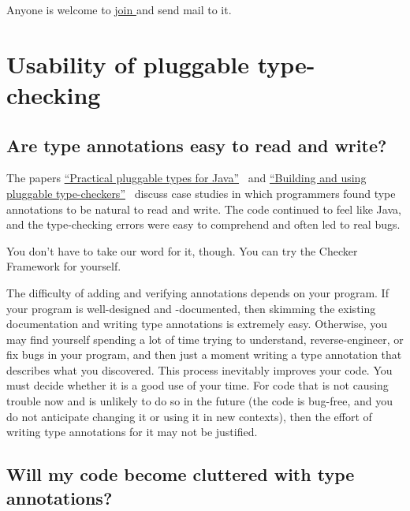 Anyone is welcome to
\href{https://groups.google.com/forum/#!forum/checker-framework-discuss}{join
  } and send mail to it.


\section{Usability of pluggable type-checking\label{faq-usability-section}}

\subsection{Are type annotations easy to read and write?\label{faq-ease-of-use}}


The papers
\href{http://homes.cs.washington.edu/~mernst/pubs/pluggable-checkers-issta2008-abstract.html}{``Practical
  pluggable types for Java''}~\cite{PapiACPE2008}
and
\href{http://homes.cs.washington.edu/~mernst/pubs/pluggable-checkers-icse2011-abstract.html}{``Building
  and using pluggable type-checkers''}~\cite{DietlDEMS2011}
discuss case studies in
which programmers
found type annotations to be natural to read and write.  The code
continued to feel like Java, and the type-checking errors were easy to
comprehend and often led to real bugs.

You don't have to take our word for it, though.  You can try the
Checker Framework for yourself.

The difficulty of adding and verifying annotations depends on your program.
If your program is well-designed and -documented, then skimming the
existing documentation and writing type annotations is extremely easy.
Otherwise, you may find yourself spending a lot of time trying to
understand, reverse-engineer, or fix bugs in your program, and then just a
moment writing a type annotation that describes what you discovered.  This
process inevitably improves your code.  You must decide whether it is a
good use of your time.  For code that is not causing trouble now and is
unlikely to do so in the future (the code is bug-free, and you do not
anticipate changing it or using it in new contexts), then the
effort of writing type annotations for it may not be justified.


\subsection{Will my code become cluttered with type annotations?\label{faq-code-clutter}}

